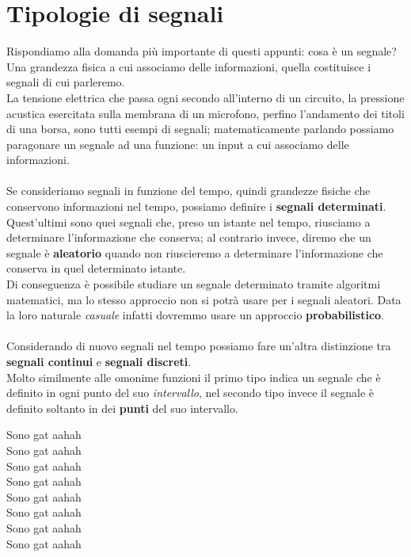 \section{Tipologie di segnali}
Rispondiamo alla domanda più importante di questi appunti: cosa è
un segnale? Una grandezza fisica a cui associamo delle informazioni, 
quella costituisce i segnali di cui parleremo. \\
La tensione elettrica che passa ogni secondo all'interno di un circuito,
la pressione acustica esercitata sulla membrana di un microfono, perfino 
l'andamento dei titoli di una borsa, sono tutti
esempi di segnali;
matematicamente parlando possiamo paragonare un segnale ad una funzione:
un input a cui associamo delle informazioni.
\\
\\
Se consideriamo segnali in funzione del tempo, quindi grandezze fisiche che
conservono informazioni nel tempo, possiamo definire i 
\textbf{segnali determinati}. Quest'ultimi sono quei segnali che, preso 
un istante nel tempo, riusciamo a determinare l'informazione che conserva;
al contrario invece, diremo che un segnale è \textbf{aleatorio} quando non 
riuscieremo a determinare l'informazione che conserva in quel determinato
istante. \\
Di conseguenza è possibile studiare un segnale determinato tramite 
algoritmi matematici, ma lo stesso approccio non si potrà usare per 
i segnali aleatori. Data la loro naturale \emph{casuale} infatti dovremmo
usare un approccio \textbf{probabilistico}.
\\
\\
Considerando di nuovo segnali nel tempo possiamo fare un'altra distinzione
tra \textbf{segnali continui} e \textbf{segnali discreti}. \\
Molto similmente alle omonime funzioni il primo tipo indica un segnale che
è definito in ogni punto del suo \emph{intervallo}, nel secondo tipo invece 
il segnale è definito soltanto in dei \textbf{punti} del suo intervallo. 



Sono gat aahah \\
Sono gat aahah \\
Sono gat aahah \\
Sono gat aahah \\
Sono gat aahah \\
Sono gat aahah \\
Sono gat aahah \\
Sono gat aahah \\
